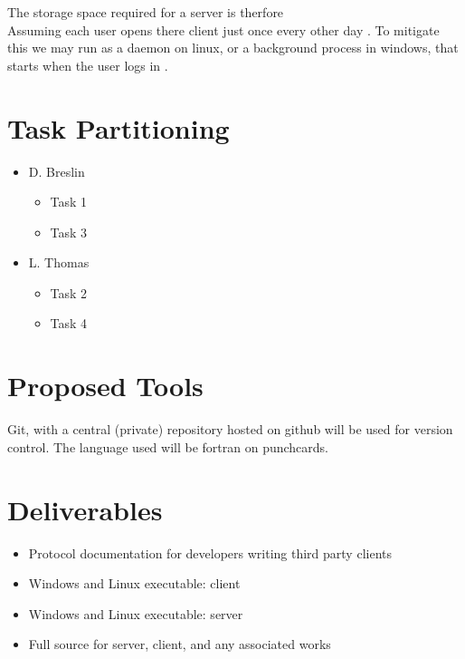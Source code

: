 The storage space required for a server is therfore \\

Assuming each user opens there client just once every other day 
. To mitigate this we may run as a daemon on linux, or a background process in
windows, that starts when the user logs in .

\section{Task Partitioning}
\begin{itemize}
\item D. Breslin
    \begin{itemize}
    \item Task 1
    \item Task 3
    \end{itemize}
\item L. Thomas
    \begin{itemize}
    \item Task 2
    \item Task 4
    \end{itemize}
\end{itemize}

\section{Proposed Tools}
Git, with a central (private) repository hosted on github will be used for
version control. The language used will be fortran on punchcards.

\section{Deliverables}
\begin{itemize}
\item Protocol documentation for developers writing third party clients
\item Windows and Linux executable: client
\item Windows and Linux executable: server
\item Full source for server, client, and any associated works
\end{itemize}
